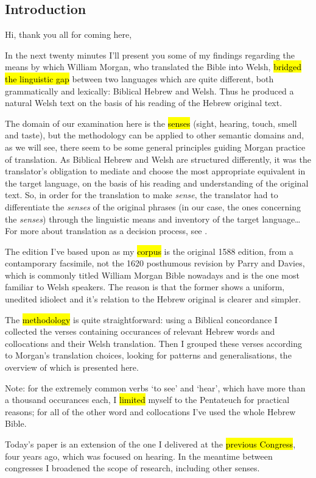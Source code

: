 \begin{paper}
	\section{Introduction}

	{\click} Hi, thank you all for coming here,

	{\click} In the next twenty minutes I’ll present you some of my findings regarding the means by which William Morgan, who translated the Bible into Welsh, \hl{bridged the linguistic gap} between two languages which are quite different, both grammatically and lexically: Biblical Hebrew and Welsh. Thus he produced a natural Welsh text on the basis of his reading of the Hebrew original text.

	The domain of our examination here is the \hl{senses} (sight, hearing, touch, smell and taste), but the methodology can be applied to other semantic domains and, as we will see, there seem to be some general principles guiding Morgan practice of translation. As Biblical Hebrew and Welsh are structured differently, it was the translator’s obligation to mediate and choose the most appropriate equivalent in the target language, on the basis of his reading and understanding of the original text. So, in order for the translation to make \emph{sense}, the translator had to differentiate the \emph{senses} of the original phrases (in our case, the ones concerning the \emph{senses}) through the linguistic means and inventory of the target language… For more about translation as a decision process, see \cite{levy.j:1967:translation}.

	{\click} The edition I’ve based upon as my \hl{corpus} is the original 1588 edition, from a contamporary facsimile, not the 1620 posthumous revision by Parry and Davies, which is commonly titled William Morgan Bible nowadays and is the one most familiar to Welsh speakers. The reason is that the former shows a uniform, unedited idiolect and it’s relation to the Hebrew original is clearer and simpler.

	{\click} The \hl{methodology} is quite straightforward: using a Biblical concordance I collected the verses containing occurances of relevant Hebrew words and collocations and their Welsh translation. Then I grouped these verses according to Morgan’s translation choices, looking for patterns and generalisations, the overview of which is presented here.

	{\click} Note: for the extremely common verbs  ‘to see’ and  ‘hear’, which have more than a thousand occurances each, I \hl{limited} myself to the Pentateuch for practical reasons; for all of the other word and collocations I’ve used the whole Hebrew Bible.

	{\click} Today’s paper is an extension of the one I delivered at the \hl{previous Congress}, four years ago, which was focused on hearing. In the meantime between congresses I broadened the scope of research, including other senses.
\end{paper}
